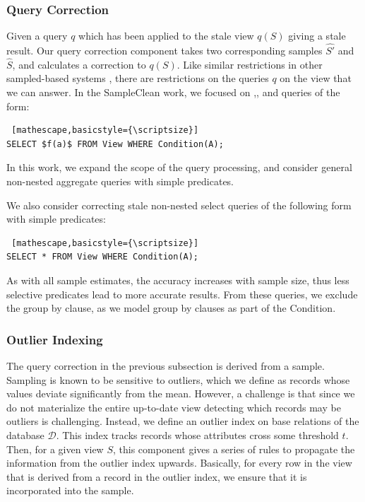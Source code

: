 \subsubsection{Query Correction}
Given a query $q$ which has been applied to the stale view $q(S)$ giving a stale result.
Our query correction component takes two corresponding samples $\hat{S'}$ and $\hat{S}$, and calculates a correction to $q(S)$.
Like similar restrictions in other sampled-based systems \cite{agarwalknowing}, there are restrictions on the queries $q$ on the view that we can answer. 
In the SampleClean work, we focused on \sumfunc,\countfunc, and \avgfunc queries of the form: 
\begin{lstlisting} [mathescape,basicstyle={\scriptsize}]
SELECT $f(a)$ FROM View WHERE Condition(A);
\end{lstlisting}
In this work, we expand the scope of the query processing, and consider general non-nested aggregate queries with simple predicates.

We also consider correcting stale non-nested select queries of the following form with simple predicates:
\begin{lstlisting} [mathescape,basicstyle={\scriptsize}]
SELECT * FROM View WHERE Condition(A);
\end{lstlisting}
As with all sample estimates, the accuracy increases with sample size, thus less selective predicates lead to more accurate results.
From these queries, we exclude the group by clause, as we model group by clauses as part of the \textsf{Condition}.

\subsubsection{Outlier Indexing}
The query correction in the previous subsection is derived from a sample.
Sampling is known to be sensitive to outliers, which we define as records whose values deviate significantly from the mean.
However, a challenge is that since we do not materialize the entire up-to-date view detecting which records may be outliers is challenging.
Instead, we define an outlier index on base relations of the database $\mathcal{D}$.
This index tracks records whose attributes cross some threshold $t$.
Then, for a given view $S$, this component gives a series of rules to propagate the information from the outlier index upwards.
Basically, for every row in the view that is derived from a record in the outlier index, we ensure that it is incorporated into the sample.

